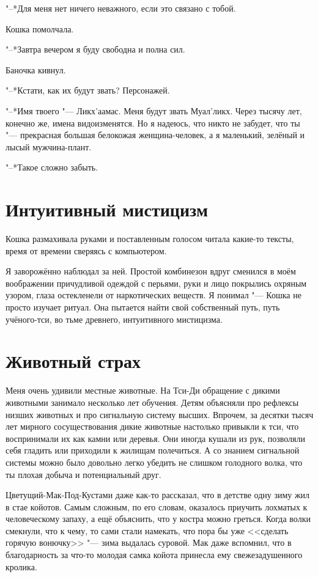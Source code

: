 \documentclass[a4paper,10pt,fleqn]{book}
\begin{document}
"--*Для меня нет ничего неважного, если это связано с тобой.

Кошка помолчала.

"--*Завтра вечером я буду свободна и полна сил.

Баночка кивнул.

"--*Кстати, как их будут звать?
Персонажей.

"--*Имя твоего "--- Ликх'аамас.
Меня будут звать Муал'ликх.
Через тысячу лет, конечно же, имена видоизменятся.
Но я надеюсь, что никто не забудет, что ты "--- прекрасная большая белокожая женщина-человек, а я маленький, зелёный и лысый мужчина-плант.

"--*Такое сложно забыть.

\section{Интуитивный мистицизм}

Кошка размахивала руками и поставленным голосом читала какие-то тексты, время от времени сверяясь с компьютером.

Я заворожённо наблюдал за ней.
Простой комбинезон вдруг сменился в моём воображении причудливой одеждой с перьями, руки и лицо покрылись охряным узором, глаза остекленели от наркотических веществ.
Я понимал "--- Кошка не просто изучает ритуал.
Она пытается найти свой собственный путь, путь учёного-тси, во тьме древнего, интуитивного мистицизма.

\section{Животный страх}

Меня очень удивили местные животные.
На Тси-Ди обращение с дикими животными занимало несколько лет обучения.
Детям объясняли про рефлексы низших животных и про сигнальную систему высших.
Впрочем, за десятки тысяч лет мирного сосуществования дикие животные настолько привыкли к тси, что воспринимали их как камни или деревья.
Они иногда кушали из рук, позволяли себя гладить или приходили к жилищам полечиться.
А со знанием сигнальной системы можно было довольно легко убедить не слишком голодного волка, что ты плохая добыча и потенциальный друг.

Цветущий-Мак-Под-Кустами даже как-то рассказал, что в детстве одну зиму жил в стае койотов.
Самым сложным, по его словам, оказалось приучить лохматых к человеческому запаху, а ещё объяснить, что у костра можно греться.
Когда волки смекнули, что к чему, то сами стали намекать, что пора бы уже <<сделать горячую вонючку>> "--- зима выдалась суровой.
Мак даже вспомнил, что в благодарность за что-то молодая самка койота принесла ему свежезадушенного кролика.
\end{document}
